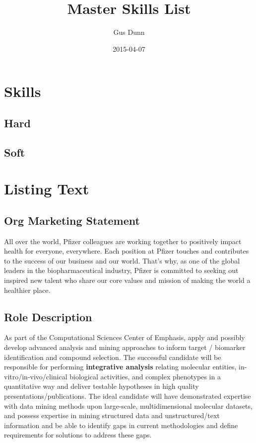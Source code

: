 \documentclass[letterpaper]{scrartcl}
\title{Master Skills List}
\author{Gus Dunn}
\date{2015-04-07}
\begin{document}
\maketitle

{
\hypersetup{linkcolor=black}
\setcounter{tocdepth}{3}
\tableofcontents
}
\section{Skills}\label{skills}

\subsection{Hard}\label{hard}

\subsection{Soft}\label{soft}

\section{Listing Text}\label{listing-text}

\subsection{Org Marketing Statement}\label{org-marketing-statement}

All over the world, Pfizer colleagues are working together to positively
impact health for everyone, everywhere. Each position at Pfizer touches
and contributes to the success of our business and our world. That's
why, as one of the global leaders in the biopharmaceutical industry,
Pfizer is committed to seeking out inspired new talent who share our
core values and mission of making the world a healthier place.

\subsection{Role Description}\label{role-description}

As part of the Computational Sciences Center of Emphasis, apply and
possibly develop advanced analysis and mining approaches to inform
target / biomarker identification and compound selection. The successful
candidate will be responsible for performing \textbf{integrative
analysis} relating molecular entities, in-vitro/in-vivo/clinical
biological activities, and complex phenotypes in a quantitative way and
deliver testable hypotheses in high quality presentations/publications.
The ideal candidate will have demonstrated expertise with data mining
methods upon large-scale, multidimensional molecular datasets, and
possess expertise in mining structured data and unstructured/text
information and be able to identify gaps in current methodologies and
define requirements for solutions to address these gaps.
\end{document}

